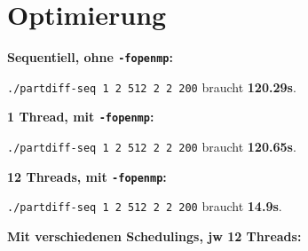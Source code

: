 \documentclass[a4paper,11pt,fleqn]{scrartcl}
\title{\titleinfo}
\author{\authorinfo}
\begin{document}
\maketitle
\notag


\section{Optimierung}\label{optimierung}

\textbf{Sequentiell, ohne \texttt{-fopenmp}:}

\texttt{./partdiff-seq 1 2 512 2 2 200} braucht \textbf{120.29s}.

\textbf{1 Thread, mit \texttt{-fopenmp}:}

\texttt{./partdiff-seq 1 2 512 2 2 200} braucht \textbf{120.65s}.

\textbf{12 Threads, mit \texttt{-fopenmp}:}

\texttt{./partdiff-seq 1 2 512 2 2 200} braucht \textbf{14.9s}.

\textbf{Mit verschiedenen Schedulings, jw 12 Threads:}
\end{document}
